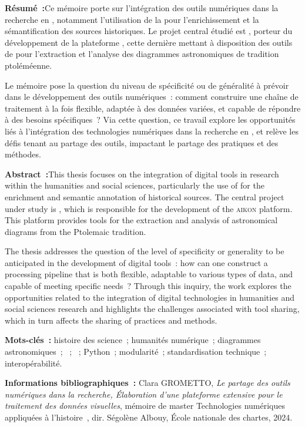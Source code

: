 \medskip	

\textbf{Résumé~:}Ce mémoire porte sur l'intégration des outils numériques dans la recherche en \shs, notamment l'utilisation de la \cv pour l'enrichissement et la sémantification des sources historiques. Le projet central étudié est \eida, porteur du développement de la plateforme \aikon, cette dernière mettant à disposition des outils de \dl pour l'extraction et l'analyse des diagrammes astronomiques de tradition ptoléméenne.

Le mémoire pose la question du niveau de spécificité ou de généralité à prévoir dans le développement des outils numériques~: comment construire une chaîne de traitement à la fois flexible, adaptée à des données variées, et capable de répondre à des besoins spécifiques~? Via cette question, ce travail explore les opportunités liés à l'intégration des technologies numériques dans la recherche en \shs, et relève les défis tenant au partage des outils, impactant le partage des pratiques et des méthodes. 

\medskip

\textbf{Abstract~:}This thesis focuses on the integration of digital tools in research within the humanities and social sciences, particularly the use of \cv for the enrichment and semantic annotation of historical sources. The central project under study is \eida, which is responsible for the development of the \textsc{aikon} platform. This platform provides \dl tools for the extraction and analysis of astronomical diagrams from the Ptolemaic tradition.

The thesis addresses the question of the level of specificity or generality to be anticipated in the development of digital tools~: how can one construct a processing pipeline that is both flexible, adaptable to various types of data, and capable of meeting specific needs~? Through this inquiry, the work explores the opportunities related to the integration of digital technologies in humanities and social sciences research and highlights the challenges associated with tool sharing, which in turn affects the sharing of practices and methods.

\medskip

\textbf{Mots-clés~:} histoire des science~; humanités numérique~; diagrammes astronomiques~; \ia~; \dl~; Python~; modularité~; standardisation technique~; interopérabilité.\\

\medskip

\textbf{Informations bibliographiques~:} Clara GROMETTO, \textit{Le partage des outils numériques dans la recherche, Élaboration d'une plateforme extensive pour le traitement des données visuelles}, mémoire de master \og Technologies numériques appliquées à l'histoire~\fg, dir. Ségolène Albouy, École nationale des chartes, 2024.
	
\clearemptydoublepage